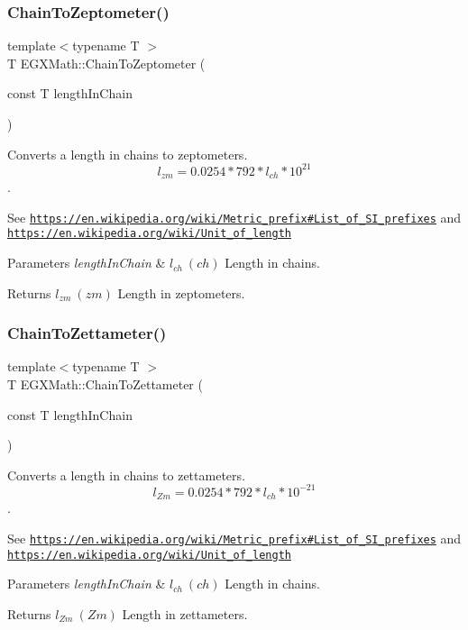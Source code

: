 \subsubsection{\texorpdfstring{Chain\+To\+Zeptometer()}{ChainToZeptometer()}}
{\footnotesize\ttfamily template$<$typename T $>$ \\
T E\+G\+X\+Math\+::\+Chain\+To\+Zeptometer (\begin{DoxyParamCaption}\item[{const T}]{length\+In\+Chain }\end{DoxyParamCaption})}



Converts a length in chains to zeptometers. \[ l_{zm}=0.0254 * 792 * l_{ch} * 10^{21} \]. 

See \href{https://en.wikipedia.org/wiki/Metric_prefix#List_of_SI_prefixes}{\tt https\+://en.\+wikipedia.\+org/wiki/\+Metric\+\_\+prefix\#\+List\+\_\+of\+\_\+\+S\+I\+\_\+prefixes} and \href{https://en.wikipedia.org/wiki/Unit_of_length}{\tt https\+://en.\+wikipedia.\+org/wiki/\+Unit\+\_\+of\+\_\+length} 
\begin{DoxyParams}{Parameters}
{\em length\+In\+Chain} & $ l_{ch}\ (ch)$ Length in chains. \\
\hline
\end{DoxyParams}
\begin{DoxyReturn}{Returns}
$ l_{zm}\ (zm)$ Length in zeptometers. 
\end{DoxyReturn}
\mbox{\label{group___e_g_x_math-_conversions-_length_conversions-_imperial-_chain-_s_i_ga8fe1fdac139b7f842766aedd772527eb}} 
\subsubsection{\texorpdfstring{Chain\+To\+Zettameter()}{ChainToZettameter()}}
{\footnotesize\ttfamily template$<$typename T $>$ \\
T E\+G\+X\+Math\+::\+Chain\+To\+Zettameter (\begin{DoxyParamCaption}\item[{const T}]{length\+In\+Chain }\end{DoxyParamCaption})}



Converts a length in chains to zettameters. \[ l_{Zm}=0.0254 * 792 * l_{ch} * 10^{-21} \]. 

See \href{https://en.wikipedia.org/wiki/Metric_prefix#List_of_SI_prefixes}{\tt https\+://en.\+wikipedia.\+org/wiki/\+Metric\+\_\+prefix\#\+List\+\_\+of\+\_\+\+S\+I\+\_\+prefixes} and \href{https://en.wikipedia.org/wiki/Unit_of_length}{\tt https\+://en.\+wikipedia.\+org/wiki/\+Unit\+\_\+of\+\_\+length} 
\begin{DoxyParams}{Parameters}
{\em length\+In\+Chain} & $ l_{ch}\ (ch)$ Length in chains. \\
\hline
\end{DoxyParams}
\begin{DoxyReturn}{Returns}
$ l_{Zm}\ (Zm)$ Length in zettameters. 
\end{DoxyReturn}
